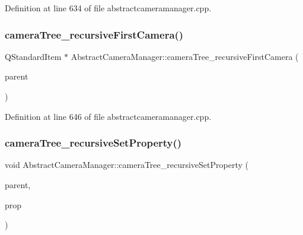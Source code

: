 Definition at line 634 of file abstractcameramanager.\+cpp.

\mbox{\label{class_abstract_camera_manager_a35d2442e2130462fc4f6f991c36d51f7}} 
\subsubsection{\texorpdfstring{cameraTree\_recursiveFirstCamera()}{cameraTree\_recursiveFirstCamera()}}
{\footnotesize\ttfamily Q\+Standard\+Item $\ast$ Abstract\+Camera\+Manager\+::camera\+Tree\+\_\+recursive\+First\+Camera (\begin{DoxyParamCaption}\item[{Q\+Standard\+Item $\ast$}]{parent }\end{DoxyParamCaption})\hspace{0.3cm}{\ttfamily [protected]}}



Definition at line 646 of file abstractcameramanager.\+cpp.

\mbox{\label{class_abstract_camera_manager_ab0fdb008fbd46d94899053d1ca671f35}} 
\subsubsection{\texorpdfstring{cameraTree\_recursiveSetProperty()}{cameraTree\_recursiveSetProperty()}}
{\footnotesize\ttfamily void Abstract\+Camera\+Manager\+::camera\+Tree\+\_\+recursive\+Set\+Property (\begin{DoxyParamCaption}\item[{Q\+Standard\+Item $\ast$}]{parent,  }\item[{\mbox{\hyperlink{class_camera_manager_1_1_camera_property}{Camera\+Manager\+::\+Camera\+Property}} $\ast$}]{prop }\end{DoxyParamCaption})\hspace{0.3cm}{\ttfamily [protected]}}



